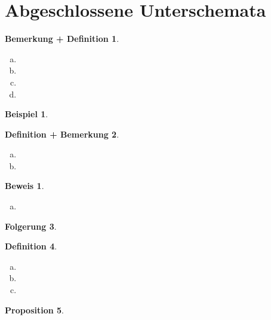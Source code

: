 \documentclass[a4paper, 12pt, numbers=noendperiod, chapterprefix=true]{scrbook}
\theoremstyle{break}
\newtheorem{Def}{Definition}[section]
\newtheorem{DefBem}[Def]{Definition + Bemerkung}
\newtheorem{BemDef}[Def]{Bemerkung + Definition}
\newtheorem{Prop}[Def]{Proposition}
\newtheorem{Folg}[Def]{Folgerung}
\theoremstyle{nonumberbreak}
\newtheorem{bsp}{Beispiel}
\newtheorem{bew}{Beweis}
\theoremstyle{nonumberplain}
\begin{document}
\section{Abgeschlossene Unterschemata}

\begin{BemDef}
\begin{enumerate}[a)]
\item
	
\item
	
\item
	
\item
	
\end{enumerate}\end{BemDef}

\begin{bsp}

\end{bsp}

\begin{DefBem}
\begin{enumerate}[a)]
\item
	
\item
	
\end{enumerate}\end{DefBem}

\begin{bew}\begin{enumerate}[a)]\item[b)]

\end{enumerate}\end{bew}

\begin{Folg}

\end{Folg}

\begin{Def}
\begin{enumerate}[a)]
\item
	
\item
	
\item
	
\end{enumerate}\end{Def}

\begin{Prop}

\end{Prop}
\end{document}
